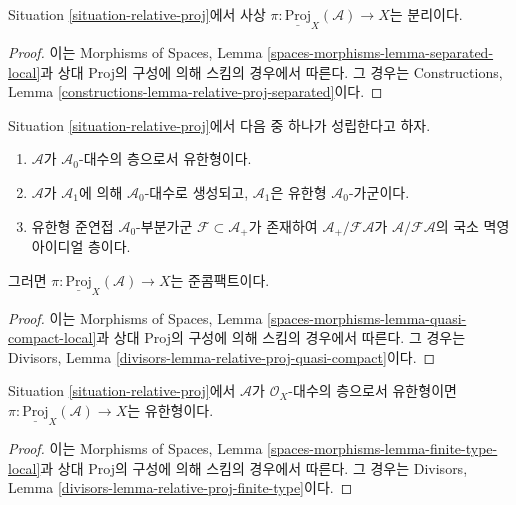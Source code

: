 \begin{lemma}
\label{lemma-relative-proj-separated}
Situation \ref{situation-relative-proj}에서 사상
$\pi : \underline{\text{Proj}}_X(\mathcal{A}) \to X$는 분리이다.
\end{lemma}

\begin{proof}
이는 Morphisms of Spaces, Lemma
\ref{spaces-morphisms-lemma-separated-local}과 상대 Proj의 구성에 의해
스킴의 경우에서 따른다. 그 경우는 Constructions, Lemma
\ref{constructions-lemma-relative-proj-separated}이다.
\end{proof}

\begin{lemma}
\label{lemma-relative-proj-quasi-compact}
Situation \ref{situation-relative-proj}에서 다음 중 하나가 성립한다고 하자.
\begin{enumerate}
\item $\mathcal{A}$가 $\mathcal{A}_0$-대수의 층으로서 유한형이다.
\item $\mathcal{A}$가 $\mathcal{A}_1$에 의해 $\mathcal{A}_0$-대수로
생성되고, $\mathcal{A}_1$은 유한형 $\mathcal{A}_0$-가군이다.
\item 유한형 준연접 $\mathcal{A}_0$-부분가군
$\mathcal{F} \subset \mathcal{A}_{+}$가 존재하여
$\mathcal{A}_{+}/\mathcal{F}\mathcal{A}$가
$\mathcal{A}/\mathcal{F}\mathcal{A}$의 국소 멱영 아이디얼 층이다.
\end{enumerate}
그러면 $\pi : \underline{\text{Proj}}_X(\mathcal{A}) \to X$는
준콤팩트이다.
\end{lemma}

\begin{proof}
이는 Morphisms of Spaces, Lemma
\ref{spaces-morphisms-lemma-quasi-compact-local}과 상대 Proj의 구성에
의해 스킴의 경우에서 따른다. 그 경우는 Divisors, Lemma
\ref{divisors-lemma-relative-proj-quasi-compact}이다.
\end{proof}

\begin{lemma}
\label{lemma-relative-proj-finite-type}
Situation \ref{situation-relative-proj}에서 $\mathcal{A}$가
$\mathcal{O}_X$-대수의 층으로서 유한형이면
$\pi : \underline{\text{Proj}}_X(\mathcal{A}) \to X$는 유한형이다.
\end{lemma}

\begin{proof}
이는 Morphisms of Spaces, Lemma
\ref{spaces-morphisms-lemma-finite-type-local}과 상대 Proj의 구성에 의해
스킴의 경우에서 따른다. 그 경우는 Divisors, Lemma
\ref{divisors-lemma-relative-proj-finite-type}이다.
\end{proof}

